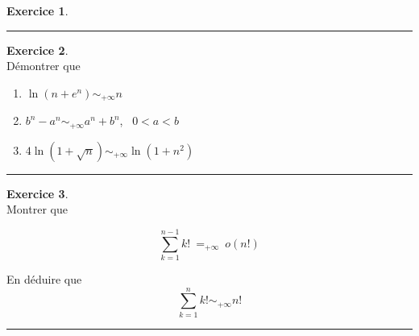 \documentclass[10pt,a4paper]{article}
\theoremstyle{definition}
\theoremstyle{definition}
\newtheorem{exo}{Exercice}
\begin{document}
\begin{minipage}{1.0\linewidth}
\begin{minipage}[t]{0.47\linewidth}
\begin{exo}
\centering
\rule{1\linewidth}{0.6pt}
\end{exo}

\begin{exo}\quad\\
Démontrer que  
\begin{enumerate}
\item$ \ln(n+ e^n) \sim_{+\infty} n$
\item $b^n-a^n   \sim_{+\infty} a^n+b^n$, \ $0<a<b$
\item $ 4\ln(1+\sqrt{n}) \sim_{+\infty} \ln(1+n^2)$
\end{enumerate}
\centering
\rule{1\linewidth}{0.6pt}
\end{exo}
\begin{exo}\quad\\
Montrer que  

$$\sum_{k=1}^{n-1}k! \ =_{+\infty} \  o\left(n!\right)$$

En déduire que
$$\sum_{k=1}^{n}k!  \sim_{+\infty} n!$$
\centering
\rule{1\linewidth}{0.6pt}
\end{exo}
\end{minipage}
\end{minipage}
\end{document}
